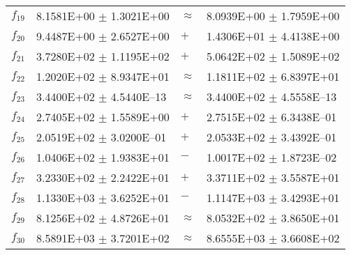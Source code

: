 \begin{table}[ht]
\begin{tabular}{|l|ll|l|}
  $f_{19}$ & 8.1581E+00 $\pm$ 1.3021E+00 & $\approx$ & 8.0939E+00 $\pm$ 1.7959E+00 \\ 
  $f_{20}$ & 9.4487E+00 $\pm$ 2.6527E+00 & $+$ & 1.4306E+01 $\pm$ 4.4138E+00 \\ 
  $f_{21}$ & 3.7280E+02 $\pm$ 1.1195E+02 & $+$ & 5.0642E+02 $\pm$ 1.5089E+02 \\ 
  $f_{22}$ & 1.2020E+02 $\pm$ 8.9347E+01 & $\approx$ & 1.1811E+02 $\pm$ 6.8397E+01 \\ 
  $f_{23}$ & 3.4400E+02 $\pm$ 4.5440E--13 & $\approx$ & 3.4400E+02 $\pm$ 4.5558E--13 \\ 
  $f_{24}$ & 2.7405E+02 $\pm$ 1.5589E+00 & $+$ & 2.7515E+02 $\pm$ 6.3438E--01 \\ 
  $f_{25}$ & 2.0519E+02 $\pm$ 3.0200E--01 & $+$ & 2.0533E+02 $\pm$ 3.4392E--01 \\ 
  $f_{26}$ & 1.0406E+02 $\pm$ 1.9383E+01 & $-$ & 1.0017E+02 $\pm$ 1.8723E--02 \\ 
  $f_{27}$ & 3.2330E+02 $\pm$ 2.2422E+01 & $+$ & 3.3711E+02 $\pm$ 3.5587E+01 \\ 
  $f_{28}$ & 1.1330E+03 $\pm$ 3.6252E+01 & $-$ & 1.1147E+03 $\pm$ 3.4293E+01 \\ 
  $f_{29}$ & 8.1256E+02 $\pm$ 4.8726E+01 & $\approx$ & 8.0532E+02 $\pm$ 3.8650E+01 \\ 
  $f_{30}$ & 8.5891E+03 $\pm$ 3.7201E+02 & $\approx$ & 8.6555E+03 $\pm$ 3.6608E+02 \\ 
   \hline
\end{tabular}
\end{table}
